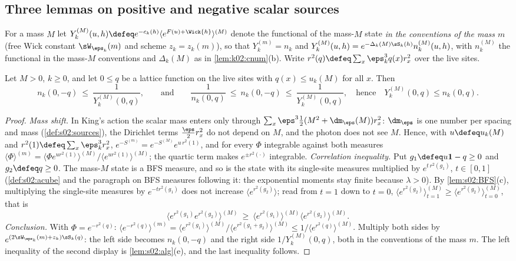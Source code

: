 \subsection{Three lemmas on positive and negative scalar sources}\label{ssec:k02:lemmas}

For a mass $M$ let $Y^{(M)}_k(u,h)\defeq e^{-c_k(h)}\langle e^{F(u)+\Wick{h}}\rangle^{(M)}$ denote the functional of the mass-$M$ state \emph{in the conventions of the mass $m$} (free Wick constant $\sW_{\eps_k}(m)$ and scheme $z_k=z_k(m)$), so that $Y^{(m)}_k=n_k$ and $Y^{(M)}_k(u,h)=e^{-\Delta_k(M)\sS_k(h)}n^{(M)}_k(u,h)$, with $n^{(M)}_k$ the functional in the mass-$M$ conventions and $\Delta_k(M)$ as in \cref{lem:k02:cnum}(b). Write $r^2(q)\defeq\sum_{x}\eps_k^3q(x)r_x^2$ over the live sites.

\begin{lemma}\label{lem:k02:GM}
Let $M>0$, $k\ge0$, and let $0\le q$ be a lattice function on the live sites with $q(x)\le u_k(M)$ for all $x$. Then
\[
n_k(0,-q)\ \le\ \frac1{Y^{(M)}_k(0,q)},\qquad\text{and}\qquad \frac1{n_k(0,q)}\ \le\ n_k(0,-q)\ \le\ \frac1{Y^{(M)}_k(0,q)},\quad\text{hence}\quad Y^{(M)}_k(0,q)\le n_k(0,q).
\]
\end{lemma}
\begin{proof}
\emph{Mass shift.} In King's action the scalar mass enters only through $\sum_x\eps^3\frac12(M^2+\dm_\eps(M))r_x^2$: $\dm_\eps$ is one number per spacing and mass (\cref{def:s02:sources}), the Dirichlet terms $\frac\eps2r_x^2$ do not depend on $M$, and the photon does not see $M$. Hence, with $u\defeq u_k(M)$ and $r^2(1)\defeq\sum_x\eps_k^3r_x^2$, $e^{-S^{(m)}}=e^{-S^{(M)}}e^{u\,r^2(1)}$, and for every $\Phi$ integrable against both measures $\langle\Phi\rangle^{(m)}=\langle\Phi e^{ur^2(1)}\rangle^{(M)}/\langle e^{ur^2(1)}\rangle^{(M)}$; the quartic term makes $e^{\pm r^2(\cdot)}$ integrable. \emph{Correlation inequality.} Put $g_1\defeq u\mathbf 1-q\ge0$ and $g_2\defeq q\ge0$. The mass-$M$ state is a BFS measure, and so is the state with its single-site measures multiplied by $e^{t\,r^2(g_1)}$, $t\in[0,1]$ (\cref{def:s02:acube} and the paragraph on BFS measures following it: the exponential moments stay finite because $\lambda>0$). By \cref{lem:s02:BFS}(c), multiplying the single-site measures by $e^{-tr^2(g_1)}$ does not increase $\langle e^{r^2(g_2)}\rangle$; read from $t=1$ down to $t=0$, $\langle e^{r^2(g_2)}\rangle^{(M)}_{t=1}\ge\langle e^{r^2(g_2)}\rangle^{(M)}_{t=0}$, that is
\[
\langle e^{r^2(g_1)}e^{r^2(g_2)}\rangle^{(M)}\ \ge\ \langle e^{r^2(g_1)}\rangle^{(M)}\langle e^{r^2(g_2)}\rangle^{(M)}.
\]
\emph{Conclusion.} With $\Phi=e^{-r^2(q)}$: $\langle e^{-r^2(q)}\rangle^{(m)}=\langle e^{r^2(g_1)}\rangle^{(M)}/\langle e^{r^2(g_1+g_2)}\rangle^{(M)}\le1/\langle e^{r^2(q)}\rangle^{(M)}$. Multiply both sides by $e^{(2\sW_{\eps_k}(m)+z_k)\sS_k(q)}$: the left side becomes $n_k(0,-q)$ and the right side $1/Y^{(M)}_k(0,q)$, both in the conventions of the mass $m$. The left inequality of the second display is \cref{lem:s02:alg}(e), and the last inequality follows.
\end{proof}


